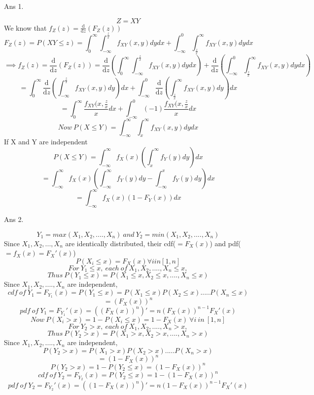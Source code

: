 \documentclass[11pt]{article}
\begin{document}
\maketitle

Ans 1.\begin{center}
$$Z=XY$$
We know that $f_Z(z) = \frac{\text{d}}{\text{d}z}(F_Z(z))$
$$F_Z(z) =P(XY \le z)= \int_{0}^{\infty}\int_{-\infty}^{\frac{z}{x}}f_{XY}(x,y)dydx + \int_{-\infty}^{0}\int_{\frac{z}{x}}^{\infty}f_{XY}(x,y)dydx$$
$$\implies f_Z(z)=\frac{\text{d}}{\text{d}z}(F_Z(z))=\frac{\text{d}}{\text{d}z}(\int_{0}^{\infty}\int_{-\infty}^{\frac{z}{x}}f_{XY}(x,y)dydx)+\frac{\text{d}}{\text{d}z}(\int_{-\infty}^{0}\int_{\frac{z}{x}}^{\infty}f_{XY}(x,y)dydx)$$
$$=\int_{0}^{\infty}\frac{\text{d}}{\text{d}z}(\int_{-\infty}^{\frac{z}{x}}f_{XY}(x,y)dy)dx+\int_{-\infty}^{0}\frac{\text{d}}{\text{d}z}(\int_{\frac{z}{x}}^{\infty}f_{XY}(x,y)dy)dx$$
$$=\int_{0}^{\infty}\frac{f_{XY}(x,\frac{z}{x}}{x}dx + \int_{-\infty}^{0}(-1)\frac{f_{XY}(x,\frac{z}{x}}{x}dx$$
$$Now\ P(X \le Y) = \int_{-\infty}^{\infty}\int_{x}^{\infty}f_{XY}(x,y)dydx$$
If X and Y are independent
$$P(X \le Y) = \int_{-\infty}^{\infty}f_X(x)(\int_{x}^{\infty}f_Y(y)dy)dx$$
$$=\int_{-\infty}^{\infty}f_X(x)(\int_{-\infty}^{\infty}f_Y(y)dy-\int_{-\infty}^{x}f_Y(y)dy)dx$$
$$=\int_{-\infty}^{\infty}f_X(x)(1-F_Y(x))dx$$
\newline
\newline
\end{center}

Ans 2.\begin{center}
$$Y_1=max(X_1,X_2,....,X_n)\ and\ Y_2=min(X_1,X_2,....,X_n)$$
Since $X_1,X_2,...,X_n$ are identically distributed, their cdf($=F_X(x)$) and pdf($=f_X(x) = F_X'(x)$)
$$P(X_i \le x) = F_X(x) \forall i in [1,n]$$
$$For\ Y_1 \le x,\ each\ of\ X_1,X_2,....,X_n \le x,$$
$$Thus\ P(Y_1\le x) = P(X_1\le x,X_2\le x,....,X_n \le x)$$
Since $X_1,X_2,....,X_n$ are independent,
$$cdf\ of\ Y_1 = F_{Y_1}(x) = P(Y_1 \le x) = P(X_1 \le x)P(X_2 \le x).....P(X_n \le x)$$
$$=(F_X(x))^n$$
$$pdf\ of\ Y_1 = F_{Y_1}'(x) = ((F_X(x))^n)' = n(F_X(x))^{n-1}F_X'(x)$$
\linebreak
$$Now\ P(X_i > x) = 1 - P(X_i \le x) = 1 - F_X(x)\ \forall i\ in\ [1,n]$$
$$For\ Y_2 > x,\ each\ of\ X_1,X_2,....,X_n > x,$$
$$Thus\ P(Y_2 > x) = P(X_1> x,X_2> x,....,X_n > x)$$
Since $X_1,X_2,....,X_n$ are independent,
$$P(Y_2 > x) = P(X_1 > x)P(X_2 > x).....P(X_n > x)$$
$$=(1 - F_X(x))^n$$
$$P(Y_2 > x) = 1 - P(Y_2 \le x) =(1 - F_X(x))^n$$
$$cdf\ of\ Y_2 = F_{Y_2}(x)=P(Y_2 \le x) = 1 - (1 - F_X(x))^n$$
$$pdf\ of\ Y_2 = F_{Y_2}'(x) = ((1 - F_X(x))^n)' = n(1 - F_X(x))^{n-1}F_X'(x)$$
\newline
\newline
\end{center}
\end{document}
